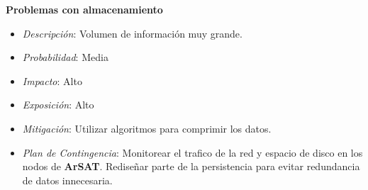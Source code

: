 \textbf{Problemas con almacenamiento}
\begin{itemize}
 \item \textsl{Descripci\'on}: Volumen de informaci\'on muy grande.
 \item \textsl{Probabilidad}: Media
 \item \textsl{Impacto}: Alto
 \item \textsl{Exposición}: Alto
 \item \textsl{Mitigación}: Utilizar algoritmos para comprimir los datos.
 \item \textsl{Plan de Contingencia}: Monitorear el trafico de la red y espacio de disco en los nodos de \textbf{ArSAT}. Rediseñar parte de la persistencia para evitar redundancia de datos innecesaria.
\end{itemize}
